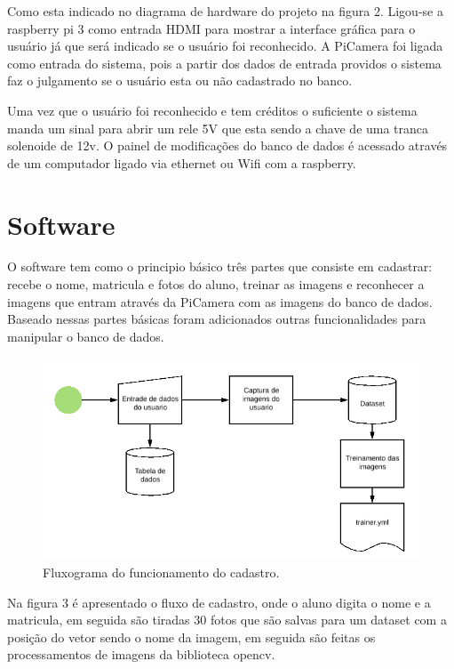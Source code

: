 \documentclass[conference,compsoc]{IEEEtran}
\begin{document}
Como esta indicado no diagrama de hardware do projeto na figura 2. Ligou-se a raspberry pi 3 como entrada HDMI para mostrar a interface gráfica para o usuário já que será indicado se o usuário foi reconhecido. A PiCamera foi ligada como entrada do sistema, pois a partir dos dados de entrada providos o sistema faz o julgamento se o usuário esta ou não cadastrado no banco.
	
	Uma vez que o usuário foi reconhecido e tem créditos o suficiente o sistema manda um sinal para abrir um rele 5V que esta sendo a chave de uma tranca solenoide de 12v. O painel de modificações do banco de dados é acessado através de um computador ligado via ethernet ou Wifi com a raspberry.
	




 \section{Software}

O software tem como o principio básico três partes que consiste em cadastrar: recebe o nome, matricula e fotos do aluno, treinar as imagens e reconhecer a imagens que entram através da PiCamera com as imagens do banco de dados. Baseado nessas partes básicas foram adicionados outras funcionalidades para manipular o banco de dados.

\begin{figure}[!ht]
		\centering
		\includegraphics[scale=0.25]{Cadastro.png}
		\caption{Fluxograma do funcionamento do cadastro.}
\end{figure}

Na figura 3 é apresentado o fluxo de cadastro, onde o aluno digita o nome e a matricula, em seguida são tiradas 30 fotos que são salvas para um dataset com a posição do vetor sendo o nome da imagem, em seguida são feitas os processamentos de imagens da biblioteca opencv.
\end{document}
